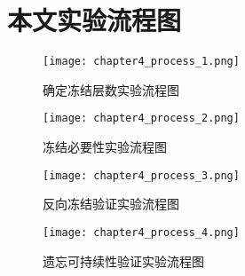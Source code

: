 
\chapter{本文实验流程图}

\begin{figure}
    \centering
    \texttt{[image: chapter4\_process\_1.png]}
    \caption{确定冻结层数实验流程图}
    \label{fig:chapter4_process_1}
\end{figure}

\begin{figure}
  \centering
  \texttt{[image: chapter4\_process\_2.png]}
  \caption{冻结必要性实验流程图}
  \label{fig:chapter4_process_2}
\end{figure}

\begin{figure}
    \centering
    \texttt{[image: chapter4\_process\_3.png]}
    \caption{反向冻结验证实验流程图}
    \label{fig:chapter4_process_3}
\end{figure}

\begin{figure}
  \centering
  \texttt{[image: chapter4\_process\_4.png]}
  \caption{遗忘可持续性验证实验流程图}
  \label{fig:chapter4_process_4}
\end{figure}
